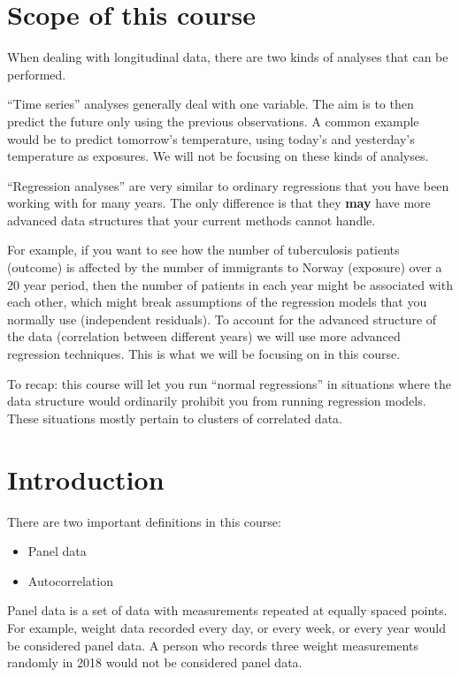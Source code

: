 \documentclass[]{book}
\providecommand{\tightlist}{%
  \setlength{\itemsep}{0pt}\setlength{\parskip}{0pt}}
\begin{document}
\section{Scope of this course}\label{scope-of-this-course}

When dealing with longitudinal data, there are two kinds of analyses
that can be performed.

``Time series'' analyses generally deal with one variable. The aim is to
then predict the future only using the previous observations. A common
example would be to predict tomorrow's temperature, using today's and
yesterday's temperature as exposures. We will not be focusing on these
kinds of analyses.

``Regression analyses'' are very similar to ordinary regressions that
you have been working with for many years. The only difference is that
they \textbf{may} have more advanced data structures that your current
methods cannot handle.

For example, if you want to see how the number of tuberculosis patients
(outcome) is affected by the number of immigrants to Norway (exposure)
over a 20 year period, then the number of patients in each year might be
associated with each other, which might break assumptions of the
regression models that you normally use (independent residuals). To
account for the advanced structure of the data (correlation between
different years) we will use more advanced regression techniques. This
is what we will be focusing on in this course.

To recap: this course will let you run ``normal regressions'' in
situations where the data structure would ordinarily prohibit you from
running regression models. These situations mostly pertain to clusters
of correlated data.

\newpage

\section{Introduction}\label{introduction}

There are two important definitions in this course:

\begin{itemize}
\tightlist
\item
  Panel data
\item
  Autocorrelation
\end{itemize}

Panel data is a set of data with measurements repeated at equally spaced
points. For example, weight data recorded every day, or every week, or
every year would be considered panel data. A person who records three
weight measurements randomly in 2018 would not be considered panel data.
\end{document}
